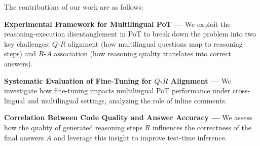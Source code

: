 The contributions of our work are as follows:
%
\begin{compactitem}
    
\item \textbf{Experimental Framework for Multilingual PoT --- }
%
We exploit the reasoning-execution disentanglement in PoT to break down the problem into two key challenges: $Q$-$R$ alignment (how multilingual questions map to reasoning steps) and $R$-$A$ association (how reasoning quality translates into correct answers).

\item \textbf{Systematic Evaluation of Fine-Tuning for $Q$-$R$ Alignment ---} We investigate how fine-tuning impacts multilingual PoT performance under cross-lingual and multilingual settings, analyzing the role of inline comments.

\item \textbf{Correlation Between Code Quality and Answer Accuracy ---} 
%
We assess how the quality of generated reasoning steps $R$ influences the correctness of the final answers $A$ and leverage this insight to improve test-time inference. 
\end{compactitem}

